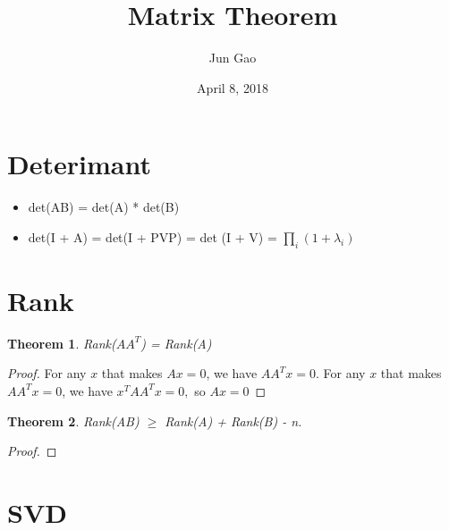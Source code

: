 \documentclass[12pt]{article}
\newtheorem{theorem}{Theorem}
\begin{document}
 
\title{Matrix Theorem}
\author{Jun Gao}
\date{April 8, 2018}

\maketitle
\section{Deterimant}
\begin{itemize}
\item det(AB) = det(A) * det(B)
\item det(I + A) = det(I + PVP) = det (I + V) = $\prod_i (1 + \lambda_i)$
\end{itemize}
 

\section{Rank}
\begin{theorem}
	Rank($AA^T$) = Rank(A)
\end{theorem}
\begin{proof}
	For any $x$ that makes $Ax=0$, we have $AA^Tx=0$. For any $x$ that makes $AA^Tx=0$, we have $x^TAA^Tx=0,$ so $Ax=0$
\end{proof}
\begin{theorem}
	Rank(AB) $\ge$ Rank(A) + Rank(B) - n.
\end{theorem}
\begin{proof}
	
\end{proof}
\section{SVD}
\end{document}
